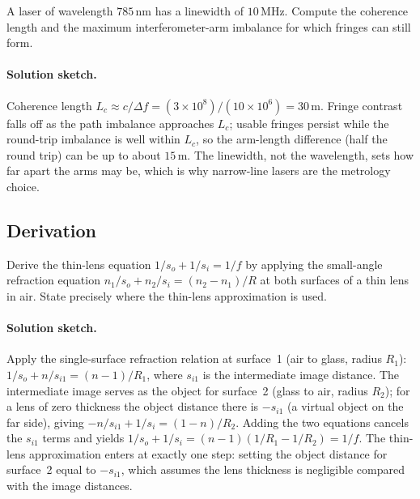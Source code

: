 \begin{exercise}
A laser of wavelength $785\,\si{\nano\meter}$ has a linewidth of
$10\,\si{\mega\hertz}$. Compute the coherence length and the
maximum interferometer-arm imbalance for which fringes can still
form.
\paragraph{Solution sketch.} Coherence length
$L_{c} \approx c/\Delta f = (3\times10^{8})/(10\times10^{6}) =
30\,\si{\meter}$. Fringe contrast falls off as the path imbalance
approaches $L_{c}$; usable fringes persist while the round-trip
imbalance is well within $L_{c}$, so the arm-length difference (half the
round trip) can be up to about $15\,\si{\meter}$. The linewidth, not the
wavelength, sets how far apart the arms may be, which is why narrow-line
lasers are the metrology choice.
\end{exercise}

\subsection*{Derivation}

\begin{exercise}
Derive the thin-lens equation $1/s_{o} + 1/s_{i} = 1/f$ by applying
the small-angle refraction equation $n_{1}/s_{o} + n_{2}/s_{i} =
(n_{2}-n_{1})/R$ at both surfaces of a thin lens in air. State
precisely where the thin-lens approximation is used.
\paragraph{Solution sketch.} Apply the single-surface refraction
relation at surface~1 (air to glass, radius $R_{1}$):
$1/s_{o} + n/s_{i1} = (n-1)/R_{1}$, where $s_{i1}$ is the intermediate
image distance. The intermediate image serves as the object for
surface~2 (glass to air, radius $R_{2}$); for a lens of zero thickness
the object distance there is $-s_{i1}$ (a virtual object on the far
side), giving $-n/s_{i1} + 1/s_{i} = (1-n)/R_{2}$. Adding the two
equations cancels the $s_{i1}$ terms and yields
$1/s_{o} + 1/s_{i} = (n-1)(1/R_{1} - 1/R_{2}) = 1/f$. The thin-lens
approximation enters at exactly one step: setting the object distance
for surface~2 equal to $-s_{i1}$, which assumes the lens thickness is
negligible compared with the image distances.
\end{exercise}

